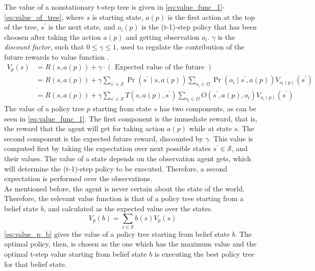 The value of a nonstationary t-step tree is given in \autoref{eq:value_func_1}-\autoref{eq:value_of_tree}, where $ s $ is starting state, $ a(p) $ is the first action at the top of the tree, $ s^\prime $ is the next state, and $ o_{i}(p) $ is the (t-1)-step policy that has been choosen after taking the action $ a(p) $ and getting observation $ o_i $. $ \gamma $ is the \textit{discount factor}, such that $ 0\leq \gamma \leq 1 $, used to regulate the contribution of the future rewards to value function \cite{Sutton2018}.
\begin{align} 
V_{p}(s) &=R(s, a(p))+\gamma \cdot(\text { Expected value of the future }) \label{eq:value_func_1}\\
&=R(s, a(p))+\gamma \sum_{s^{\prime} \in \mathcal{S}} \operatorname{Pr}\left(s^{\prime} \mid s, a(p)\right) \sum_{o_{i} \in \Omega} \operatorname{Pr}\left(o_{i} \mid s^{\prime}, a(p)\right) V_{o_{i}(p)}\left(s^{\prime}\right) \label{eq:value_func_2}\\
&=R(s, a(p))+\gamma \sum_{s^{\prime} \in \mathcal{S}} T\left(s, a(p), s^{\prime}\right) \sum_{o_{i} \in \Omega} O\left(s^{\prime}, a(p), o_{i}\right) V_{o_{i}(p)}\left(s^{\prime}\right) 
\label{eq:value_of_tree}
\end{align}
The value of a policy tree $ p $ starting from state $ s $ has two components, as can be seen in \autoref{eq:value_func_1}. The first component is the immediate reward, that is, the reward that the agent will get for taking action $ a(p) $ while at state $ s $. The second component is the expected future reward, discounted by $ \gamma $. This value is computed first by taking the expectation over next possible states $ s^\prime \in \mathcal{S} $, and their values. The value of a state depends on the observation agent gets, which will determine the (t-1)-step policy to be executed. Therefore, a second expectation is performed over the observations. \\
As mentioned before, the agent is never certain about the state of the world. Therefore, the relevant value function is that of a policy tree starting from a belief state $ b $, and  calculated as the expected value over the states.
\begin{equation}
V_{p}(b)=\sum_{s \in \mathcal{S}} b(s) V_{p}(s)
\label{eq:value_p_b}
\end{equation}
\autoref{eq:value_p_b} gives the value of a policy tree starting from belief state $ b $. The optimal policy, then, is chosen as the one which has the maximum value and the optimal t-step value starting from belief state $ b $ is executing the best policy tree for that belief state.
